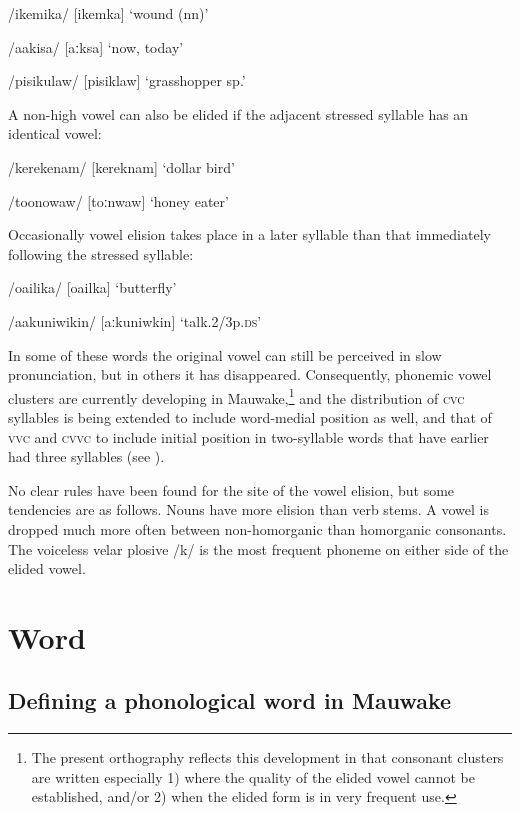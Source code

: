 /ikemika/  [i{{\textprimstress}kemka}]  `wound (nn)'

/aakisa/  [{{\textprimstress}aːksa}]  `now, today'

/pisikulaw/  [pi{{\textprimstress}siklaw}]  `grasshopper sp.'

A non-high vowel can also be elided if the adjacent stressed syllable has an identical vowel:

/kerekenam/  [ke{{\textprimstress}reknam}]  `dollar bird'

/toonowaw/  [{{\textprimstress}toːnwaw}]  `honey eater'

Occasionally vowel elision takes place in a later syllable than that immediately following the stressed syllable: 

/o{\textphi}a{\textphi}ilika/  [o{{\textprimstress}}{\textphi}a{\textphi}ilka]  `butterfly'

/aakuniwikin/  [aːkuniwkin]  `talk.2/3p.\textsc{ds}'

In some of these words the original vowel can still be perceived in slow pronunciation, but in others it has disappeared. Consequently, phonemic vowel clusters are currently developing in Mauwake,\footnote{The present orthography reflects this development in that consonant clusters are written especially 1) where the quality of the elided vowel cannot be established, and/or 2) when the elided form is in very frequent use.} and the distribution of \textsc{cvc} syllables is being extended to include word-medial position as well, and that of \textsc{vvc} and \textsc{cvvc} to include initial position in two-syllable words that have earlier had three syllables (see ).

No clear rules have been found for the site of the vowel elision, but some tendencies are as follows. Nouns have more elision than verb stems. A vowel is dropped much more often between non-homorganic than homorganic consonants. The voiceless velar plosive /k/ is the most frequent phoneme on either side of the elided vowel.

\section{Word} 

\subsection{Defining a phonological word in Mauwake}

